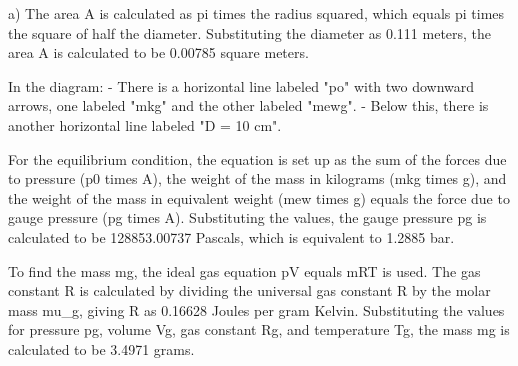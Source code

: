 a) The area A is calculated as pi times the radius squared, which equals pi times the square of half the diameter. Substituting the diameter as 0.111 meters, the area A is calculated to be 0.00785 square meters.

In the diagram:
- There is a horizontal line labeled "po" with two downward arrows, one labeled "mkg" and the other labeled "mewg".
- Below this, there is another horizontal line labeled "D = 10 cm".

For the equilibrium condition, the equation is set up as the sum of the forces due to pressure (p0 times A), the weight of the mass in kilograms (mkg times g), and the weight of the mass in equivalent weight (mew times g) equals the force due to gauge pressure (pg times A). Substituting the values, the gauge pressure pg is calculated to be 128853.00737 Pascals, which is equivalent to 1.2885 bar.

To find the mass mg, the ideal gas equation pV equals mRT is used. The gas constant R is calculated by dividing the universal gas constant R by the molar mass mu_g, giving R as 0.16628 Joules per gram Kelvin. Substituting the values for pressure pg, volume Vg, gas constant Rg, and temperature Tg, the mass mg is calculated to be 3.4971 grams.